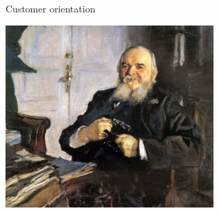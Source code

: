 \documentclass{beamer}
\begin{document}
\begin{frame}
{\centerline{Customer orientation}}

\begin{center}
\includegraphics[width=8cm]{P2023.AIBCCSS.Drawing/serov_turchaninov.jpg}
\end{center}

\end{frame}
\end{document}
